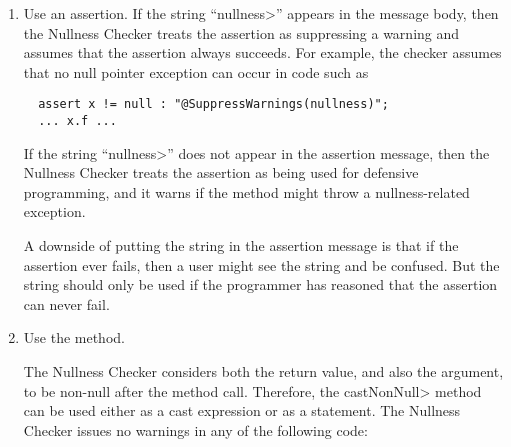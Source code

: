 \newcommand{\nullnessSuppressionString}{nullness}

\begin{enumerate}
\item
  Use an assertion.  If the string ``\<\nullnessSuppressionString>''
  appears in the message body, then the Nullness Checker treats the
  assertion as suppressing a warning and assumes that the assertion always
  succeeds.  For example, the checker assumes that no null pointer
  exception can occur in code such as
\begin{Verbatim}
  assert x != null : "@SuppressWarnings(nullness)";
  ... x.f ...
\end{Verbatim}

  If the string ``\<\nullnessSuppressionString>'' does not appear in the
  assertion message, then the Nullness Checker treats the assertion as being
  used for defensive programming, and it warns if the method might throw a
  nullness-related exception.

  A downside of putting the string in the assertion message is that if the
  assertion ever fails, then a user might see the string and be confused.
  But the string should only be used if the programmer has reasoned that
  the assertion can never fail.





\item
  Use the  method.

The Nullness
 Checker considers both the return value, and also the argument, to
 be non-null after the method call.  Therefore, the
 \<castNonNull> method can be used either as a cast expression or
 as a statement.  The Nullness Checker issues no warnings in any of
the following code:


\end{enumerate}
